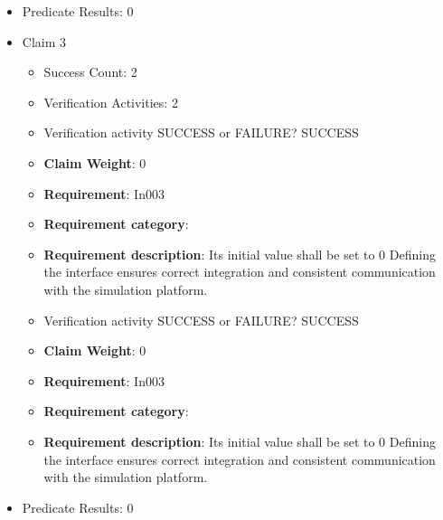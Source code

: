 \documentclass{article}
\begin{document}
\begin{itemize}
\begin{itemize}
					\item Verification activity SUCCESS or FAILURE? SUCCESS
					\item \textbf{Claim Weight}: 0
						\item \textbf{Requirement}: In002 
						\item \textbf{Requirement category}: Interfacesexistance 
						\item \textbf{Requirement description}: Its initial value shall be set to 0 Defining the interface ensures correct integration and consistent communication with the simulation platform.
					
				\end{itemize}
				
									    
				\item Predicate Results: 0

  				  \item Claim 3
				\begin{itemize}
			    	\item Success Count: 2 
			    	\item Verification Activities: 2
					\item Verification activity SUCCESS or FAILURE? SUCCESS
					\item \textbf{Claim Weight}: 0
						\item \textbf{Requirement}: In003 
						\item \textbf{Requirement category}:  
						\item \textbf{Requirement description}: Its initial value shall be set to 0 Defining the interface ensures correct integration and consistent communication with the simulation platform.
					
					\item Verification activity SUCCESS or FAILURE? SUCCESS
					\item \textbf{Claim Weight}: 0
						\item \textbf{Requirement}: In003 
						\item \textbf{Requirement category}:  
						\item \textbf{Requirement description}: Its initial value shall be set to 0 Defining the interface ensures correct integration and consistent communication with the simulation platform.
					
				\end{itemize}
				
									    
				\item Predicate Results: 0


\end{itemize}
\end{document}

